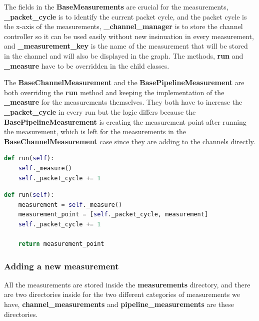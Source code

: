 The fields in the \textbf{BaseMeasurements} are crucial for the measurements, \textbf{\_packet\_cycle} is
to identify the current packet cycle, and the packet cycle is the x-axis of the measurements,
\textbf{\_channel\_manager} is to store the channel controller so it can be used easily without new insinuation
in every measurement, and \textbf{\_measurement\_key} is the name of the measurement that will be stored in the channel
and will also be displayed in the graph. The methods, \textbf{run} and \textbf{\_measure} have to 
be overridden in the child classes.

The \textbf{BaseChannelMeasurement} and the \textbf{BasePipelineMeasurement} are both overriding the 
\textbf{run} method and keeping the implementation of the \textbf{\_measure} for the measurements themselves. 
They both have to increase the \textbf{\_packet\_cycle} in every run but the logic differs because
the \textbf{BasePipelineMeasurement} is creating the measurement point after running the measurement, which
is left for the measurements in the \textbf{BaseChannelMeasurement} case since they are adding to the channels
directly.
\newline
\begin{lstlisting}[language=Python, caption={BaseChannelMeasurement's run method},captionpos=b]
def run(self):
	self._measure()
	self._packet_cycle += 1
\end{lstlisting}

\begin{lstlisting}[language=Python, caption={BasePipelineMeasurement's run method},captionpos=b]
def run(self):
	measurement = self._measure()
	measurement_point = [self._packet_cycle, measurement]
	self._packet_cycle += 1

	return measurement_point

\end{lstlisting}

\subsubsection{Adding a new measurement}
All the measurements are stored inside the \textbf{measurements} directory, and there are two directories
inside for the two different categories of measurements we have, \textbf{channel\_measurements} and 
\textbf{pipeline\_measurements} are these directories.

